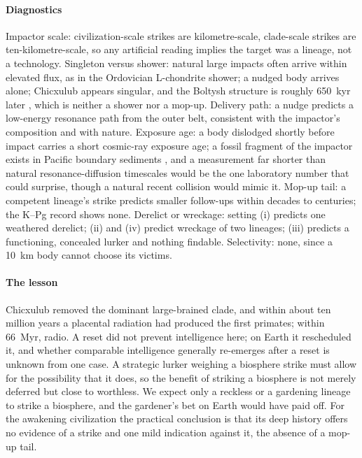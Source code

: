 \documentclass[preprint,12pt]{elsarticle}
\theoremstyle{definition}
\begin{document}
\paragraph{Diagnostics} Impactor scale: civilization-scale strikes are kilometre-scale, clade-scale strikes are ten-kilometre-scale, so any artificial reading implies the target was a lineage, not a technology. Singleton versus shower: natural large impacts often arrive within elevated flux, as in the Ordovician L-chondrite shower; a nudged body arrives alone; Chicxulub appears singular, and the Boltysh structure is roughly 650~kyr later \citep{Pickersgill2021}, which is neither a shower nor a mop-up. Delivery path: a nudge predicts a low-energy resonance path from the outer belt, consistent with the impactor's composition and with nature. Exposure age: a body dislodged shortly before impact carries a short cosmic-ray exposure age; a fossil fragment of the impactor exists in Pacific boundary sediments \citep{Kyte1998}, and a measurement far shorter than natural resonance-diffusion timescales would be the one laboratory number that could surprise, though a natural recent collision would mimic it. Mop-up tail: a competent lineage's strike predicts smaller follow-ups within decades to centuries; the K--Pg record shows none. Derelict or wreckage: setting (i) predicts one weathered derelict; (ii) and (iv) predict wreckage of two lineages; (iii) predicts a functioning, concealed lurker and nothing findable. Selectivity: none, since a 10~km body cannot choose its victims.

\paragraph{The lesson} Chicxulub removed the dominant large-brained clade, and within about ten million years a placental radiation had produced the first primates; within 66~Myr, radio. A reset did not prevent intelligence here; on Earth it rescheduled it, and whether comparable intelligence generally re-emerges after a reset is unknown from one case. A strategic lurker weighing a biosphere strike must allow for the possibility that it does, so the benefit of striking a biosphere is not merely deferred but close to worthless. We expect only a reckless or a gardening lineage to strike a biosphere, and the gardener's bet on Earth would have paid off. For the awakening civilization the practical conclusion is that its deep history offers no evidence of a strike and one mild indication against it, the absence of a mop-up tail.
\end{document}
